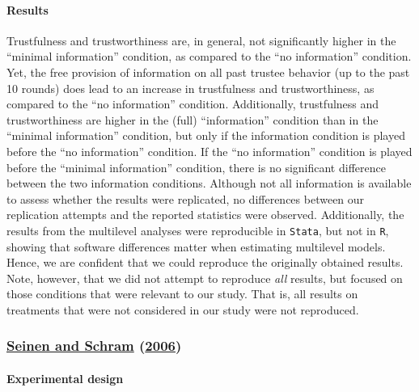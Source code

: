 \documentclass[
  11pt,
]{article}
\begin{document}
\hypertarget{results-2}{%
\paragraph{Results}\label{results-2}}

Trustfulness and trustworthiness are, in general, not significantly higher in the ``minimal information'' condition, as compared to the ``no information'' condition.
Yet, the free provision of information on all past trustee behavior (up to the past 10 rounds) does lead to an increase in trustfulness and trustworthiness, as compared to the ``no information'' condition.
Additionally, trustfulness and trustworthiness are higher in the (full) ``information'' condition than in the ``minimal information'' condition, but only if the information condition is played before the ``no information'' condition.
If the ``no information'' condition is played before the ``minimal information'' condition, there is no significant difference between the two information conditions.
Although not all information is available to assess whether the results were replicated, no differences between our replication attempts and the reported statistics were observed.
Additionally, the results from the multilevel analyses were reproducible in \texttt{Stata}, but not in \texttt{R}, showing that software differences matter when estimating multilevel models.
Hence, we are confident that we could reproduce the originally obtained results.
Note, however, that we did not attempt to reproduce \emph{all} results, but focused on those conditions that were relevant to our study.
That is, all results on treatments that were not considered in our study were not reproduced.

\hypertarget{seinen_schram_social_2006}{%
\subsubsection{\texorpdfstring{\protect\hyperlink{ref-seinen_schram_social_2006}{Seinen and Schram} (\protect\hyperlink{ref-seinen_schram_social_2006}{2006})}{Seinen and Schram (2006)}}\label{seinen_schram_social_2006}}

\hypertarget{experimental-design-2}{%
\paragraph{Experimental design}\label{experimental-design-2}}
\end{document}
